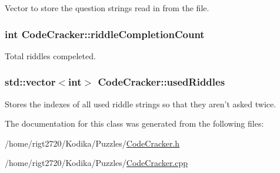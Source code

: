 Vector to store the question strings read in from the file. 

\hypertarget{classCodeCracker_aca60d7cc01bda0ec6782984e46b9b357}{
\subsubsection[{riddle\-Completion\-Count}]{\setlength{\rightskip}{0pt plus 5cm}int Code\-Cracker\-::riddle\-Completion\-Count\hspace{0.3cm}{\ttfamily [private]}}}\label{classCodeCracker_aca60d7cc01bda0ec6782984e46b9b357}


Total riddles compeleted. 

\hypertarget{classCodeCracker_a9b54be5b85162c25c8e42ce1e865882a}{
\subsubsection[{used\-Riddles}]{\setlength{\rightskip}{0pt plus 5cm}std\-::vector$<$int$>$ Code\-Cracker\-::used\-Riddles\hspace{0.3cm}{\ttfamily [private]}}}\label{classCodeCracker_a9b54be5b85162c25c8e42ce1e865882a}
Stores the indexes of all used riddle strings so that they aren't asked twice. 

The documentation for this class was generated from the following files\-:\begin{DoxyCompactItemize}
\item 
/home/rigt2720/\-Kodika/\-Puzzles/\hyperlink{CodeCracker_8h}{Code\-Cracker.\-h}\item 
/home/rigt2720/\-Kodika/\-Puzzles/\hyperlink{CodeCracker_8cpp}{Code\-Cracker.\-cpp}\end{DoxyCompactItemize}
